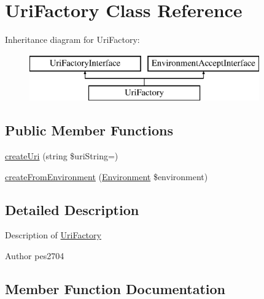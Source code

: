 \hypertarget{class_pes_1_1_http_1_1_factory_1_1_uri_factory}{}\section{Uri\+Factory Class Reference}
\label{class_pes_1_1_http_1_1_factory_1_1_uri_factory}
Inheritance diagram for Uri\+Factory\+:\begin{figure}[H]
\begin{center}
\leavevmode
\includegraphics[height=2.000000cm]{class_pes_1_1_http_1_1_factory_1_1_uri_factory}
\end{center}
\end{figure}
\subsection*{Public Member Functions}
\begin{DoxyCompactItemize}
\item 
\mbox{\hyperlink{class_pes_1_1_http_1_1_factory_1_1_uri_factory_a56bc76febb6104edfde8e766f5b644ee}{create\+Uri}} (string \$uri\+String=\textquotesingle{}\textquotesingle{})
\item 
\mbox{\hyperlink{class_pes_1_1_http_1_1_factory_1_1_uri_factory_aabcd9fd040e8ac574247abda286cb59f}{create\+From\+Environment}} (\mbox{\hyperlink{class_pes_1_1_http_1_1_environment}{Environment}} \$environment)
\end{DoxyCompactItemize}


\subsection{Detailed Description}
Description of \mbox{\hyperlink{class_pes_1_1_http_1_1_factory_1_1_uri_factory}{Uri\+Factory}}

\begin{DoxyAuthor}{Author}
pes2704 
\end{DoxyAuthor}


\subsection{Member Function Documentation}
\mbox{\label{class_pes_1_1_http_1_1_factory_1_1_uri_factory_aabcd9fd040e8ac574247abda286cb59f}} 
